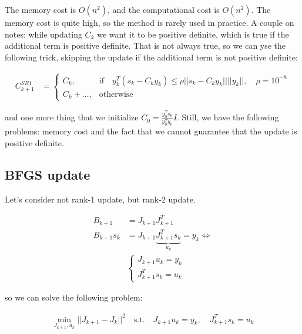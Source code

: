 The memory cost is $O(n^2)$, and the computational cost is $O(n^2)$. The memory cost is quite high, so the method is rarely used in practice. A couple on notes: while updating $C_k$ we want it to be positive definite, which is true if the additional term is positive definite. That is not always true, so we can yse the following trick, skipping the update if the additional term is not positive definite: 

\begin{equation*}
    \begin{aligned}
        C_{k+1}^{SR1} &= 
        \begin{cases}
            C_k , &\text{if} \quad y_k^T(s_k - C_k y_k) \leq \rho ||s_k - C_k y_k|| ||y_k||, \quad \rho = 10^{-8} \\ 
            C_k + \ldots, &\text{otherwise}
        \end{cases}
    \end{aligned}
\end{equation*}

and one more thing that we initialize $C_0 = \frac{y_0^T s_0}{y_0^T y_0} I$. Still, we have the following problems: memory cost and the fact that we cannot guarantee that the update is positive definite.

\subsection{BFGS update}

Let's consider not rank-1 update, but rank-2 update. 

\begin{equation*}
    \begin{aligned}
        B_{k+1} &= J_{k+1} J_{k+1}^T \\ 
        B_{k+1} s_k &= J_{k+1} \underbrace{J_{k+1}^T s_k}_{u_k} = y_k \Leftrightarrow \\
        &\begin{cases}
            J_{k+1} u_k = y_k \\ 
            J_{k+1}^T s_k = u_k
        \end{cases}
    \end{aligned}
\end{equation*}

so we can solve the following problem:

\begin{equation*}
    \begin{aligned}
        \min_{J_{k+1}, u_k} ||J_{k+1} - J_k||^2 \quad \text{s.t.} \quad J_{k+1} u_k = y_k, \quad J_{k+1}^T s_k = u_k
    \end{aligned}
\end{equation*}

